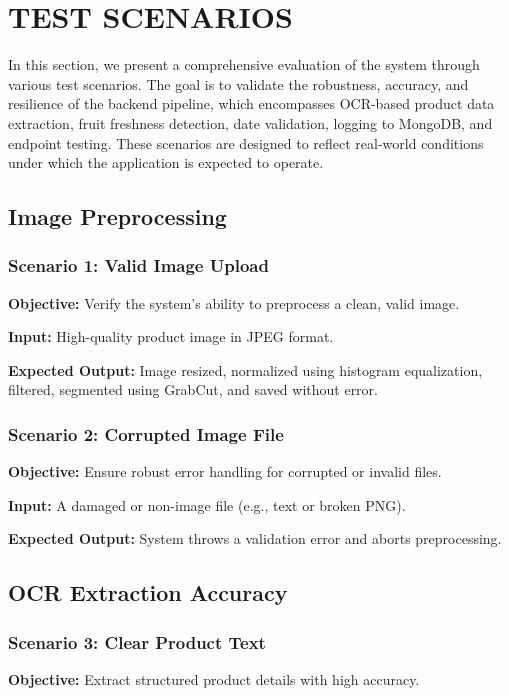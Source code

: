 \documentclass[12pt]{report}
\begin{document}
\section{TEST SCENARIOS}
In this section, we present a comprehensive evaluation of the system through various test scenarios. The goal is to validate the robustness, accuracy, and resilience of the backend pipeline, which encompasses OCR-based product data extraction, fruit freshness detection, date validation, logging to MongoDB, and endpoint testing. These scenarios are designed to reflect real-world conditions under which the application is expected to operate.

\subsection{Image Preprocessing}

\subsubsection{Scenario 1: Valid Image Upload}
\textbf{Objective:} Verify the system's ability to preprocess a clean, valid image.

\textbf{Input:} High-quality product image in JPEG format.

\textbf{Expected Output:} Image resized, normalized using histogram equalization, filtered, segmented using GrabCut, and saved without error.

\subsubsection{Scenario 2: Corrupted Image File}
\textbf{Objective:} Ensure robust error handling for corrupted or invalid files.

\textbf{Input:} A damaged or non-image file (e.g., text or broken PNG).

\textbf{Expected Output:} System throws a validation error and aborts preprocessing.

\subsection{OCR Extraction Accuracy}

\subsubsection{Scenario 3: Clear Product Text}
\textbf{Objective:} Extract structured product details with high accuracy.
\end{document}
